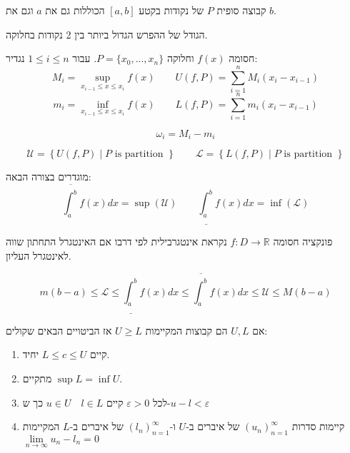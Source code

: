 \documentclass{tstextbook}
\begin{document}
\begin{definition}
קבוצה סופית \(P\) של נקודות בקטע \([a,b]\) הכוללות גם את \(a\) וגם את \(b\).

\end{definition}
\begin{definition}
הגודל של ההפרש הגדול ביותר בין 2 נקודות בחלוקה.

\end{definition}
\begin{definition}
חסומה \(f(x)\) וחלוקה \(P=\{x_0, ... , x_n\}\). עבור \(1\leq i\leq n\) נגדיר:
$$M_i = \underset{x_{i-1}\leq x\leq x_i}{\sup}f(x)\qquad U(f,P)=\sum_{i=1}^{n} M_i (x_i - x_{i-1})$$$$m_i = \underset{x_{i-1}\leq x\leq x_i}{\inf}f(x)\qquad L(f,P)=\sum_{i=1}^{n} m_i (x_i - x_{i-1}) $$

\end{definition}
\begin{definition}
$$\omega_i = M_i - m_i$$

\end{definition}
\begin{definition}
$$\mathcal{U} = \left\{U(f,P) \mid P \text{ is partition } \right\}\qquad \mathcal{L} = \left\{L(f,P) \mid P \text{ is partition } \right\}$$

\end{definition}
\begin{definition}
מוגדרים בצורה הבאה:
$$\overline{\int_a^b} f(x) dx = \sup(\mathcal{U})\qquad \underline{\int_a^b} f(x)dx=\inf(\mathcal{L})$$

\end{definition}
\begin{definition}
פונקציה חסומה \(f:D\to \mathbb{R}\) נקראת אינטגרבילית לפי דרבו אם האינטגרל התחתון שווה לאינטגרל העליון.

\end{definition}
\begin{proposition}
$$m(b-a)\leq \mathcal{L}\leq \underline{\int_a^b} f(x)dx \leq \overline{\int_a^b} f(x) dx \leq \mathcal{U}\leq M(b-a)$$

\end{proposition}
\begin{proposition}
אם \(U,L\) הם קבוצות המקיימות \(U\geq L\) אז הביטויים הבאים שקולים: 

  \begin{enumerate}
    \item קיים \(L\leq c\leq U\) יחיד. 


    \item מתקיים \(\sup L = \inf U\). 


    \item לכל \(\varepsilon>0\) קיים \(u\in U\quad l\in L\) כך ש-\(u-l<\varepsilon\)


    \item קיימות סדרות \((u_n)_{n=1}^{\infty}\) של איברים ב-\(U\) ו-\((l_n)_{n=1}^\infty\) של איברים ב-\(L\) המקיימות \(\underset{n\rightarrow\infty}{\lim }u_n - l_n = 0\)


  \end{enumerate}
\end{proposition}
\end{document}
